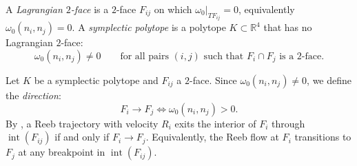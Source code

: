 \begin{definition}\label{def:symplectic-polytope}
A \emph{Lagrangian $2$-face} is a $2$-face $F_{ij}$ on which
$\omega_0|_{T F_{ij}} = 0$, equivalently $\omega_0(n_i, n_j) = 0$.
A \emph{symplectic polytope} is a polytope $K \subset \mathbb{R}^4$
that has no Lagrangian $2$-face:
\[
  \omega_0(n_i, n_j) \neq 0
  \qquad \text{for all pairs } (i,j)
  \text{ such that } F_i \cap F_j \text{ is a $2$-face.}
\]
\end{definition}

\begin{definition}\label{def:directed-2-face}
Let $K$ be a symplectic polytope and $F_{ij}$ a $2$-face.
Since $\omega_0(n_i, n_j) \neq 0$, we define the \emph{direction}:
\[ F_i \to F_j \iff \omega_0(n_i, n_j) > 0. \]
By \cite[Lem.~3.9]{CH2021}, a Reeb trajectory with velocity $R_i$
exits the interior of $F_i$ through $\operatorname{int}(F_{ij})$
if and only if $F_i \to F_j$.
Equivalently, the Reeb flow at $F_i$ transitions to $F_j$
at any breakpoint in $\operatorname{int}(F_{ij})$.
\end{definition}

